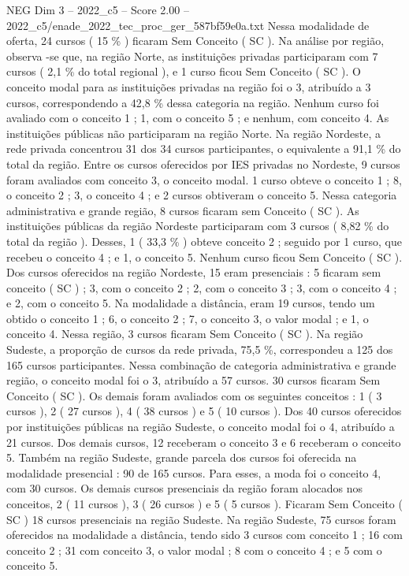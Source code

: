\begin{textsample}{NEG Dim 3 – 2022\_c5 – Score 2.00 – 2022\_c5/enade\_2022\_tec\_proc\_ger\_587bf59e0a.txt}
Nessa modalidade de oferta, 24 cursos ( 15 \% ) ficaram Sem Conceito ( SC ).
Na análise por região, observa -se que, na região Norte, as instituições privadas participaram com 7 cursos ( 2,1 \% do total regional ), e 1 curso ficou Sem Conceito ( SC ).
O conceito modal para as instituições privadas na região foi o 3, atribuído a 3 cursos, correspondendo a 42,8 \% dessa categoria na região.
Nenhum curso foi avaliado com o conceito 1 ; 1, com o conceito 5 ; e nenhum, com conceito 4.
As instituições públicas não participaram na região Norte.
Na região Nordeste, a rede privada concentrou 31 dos 34 cursos participantes, o equivalente a 91,1 \% do total da região.
Entre os cursos oferecidos por IES privadas no Nordeste, 9 cursos foram avaliados com conceito 3, o conceito modal. 1 curso obteve o conceito 1 ; 8, o conceito 2 ; 3, o conceito 4 ; e 2 cursos obtiveram o conceito 5.
Nessa categoria administrativa e grande região, 8 cursos ficaram sem Conceito ( SC ).
As instituições públicas da região Nordeste participaram com 3 cursos ( 8,82 \% do total da região ).
Desses, 1 ( 33,3 \% ) obteve conceito 2 ; seguido por 1 curso, que recebeu o conceito 4 ; e 1, o conceito 5.
Nenhum curso ficou Sem Conceito ( SC ).
Dos cursos oferecidos na região Nordeste, 15 eram presenciais : 5 ficaram sem conceito ( SC ) ; 3, com o conceito 2 ; 2, com o conceito 3 ; 3, com o conceito 4 ; e 2, com o conceito 5.
Na modalidade a distância, eram 19 cursos, tendo um obtido o conceito 1 ; 6, o conceito 2 ; 7, o conceito 3, o valor modal ; e 1, o conceito 4.
Nessa região, 3 cursos ficaram Sem Conceito ( SC ).
Na região Sudeste, a proporção de cursos da rede privada, 75,5 \%, correspondeu a 125 dos 165 cursos participantes.
Nessa combinação de categoria administrativa e grande região, o conceito modal foi o 3, atribuído a 57 cursos. 30 cursos ficaram Sem Conceito ( SC ).
Os demais foram avaliados com os seguintes conceitos : 1 ( 3 cursos ), 2 ( 27 cursos ), 4 ( 38 cursos ) e 5 ( 10 cursos ).
Dos 40 cursos oferecidos por instituições públicas na região Sudeste, o conceito modal foi o 4, atribuído a 21 cursos.
Dos demais cursos, 12 receberam o conceito 3 e 6 receberam o conceito 5.
Também na região Sudeste, grande parcela dos cursos foi oferecida na modalidade presencial : 90 de 165 cursos.
Para esses, a moda foi o conceito 4, com 30 cursos.
Os demais cursos presenciais da região foram alocados nos conceitos, 2 ( 11 cursos ), 3 ( 26 cursos ) e 5 ( 5 cursos ).
Ficaram Sem Conceito ( SC ) 18 cursos presenciais na região Sudeste.
Na região Sudeste, 75 cursos foram oferecidos na modalidade a distância, tendo sido 3 cursos com conceito 1 ; 16 com conceito 2 ; 31 com conceito 3, o valor modal ; 8 com o conceito 4 ; e 5 com o conceito 5.

\end{textsample}
